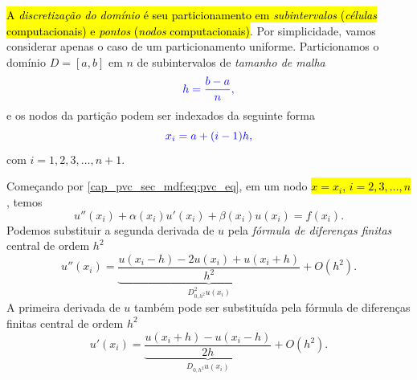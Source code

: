 \begin{flushleft}
\end{flushleft}

\hl{A \emph{discretização do domínio} é seu particionamento em \emph{subintervalos} (\emph{células} computacionais) e \emph{pontos} (\emph{nodos} computacionais)}. Por simplicidade, vamos considerar apenas o caso de um particionamento uniforme. Particionamos o domínio $D = [a, b]$ em $n$ de subintervalos de \emph{tamanho de malha}
\begin{equation}\color{blue}h = \frac{b-a}{n},
\end{equation}
e os nodos da partição podem ser indexados da seguinte forma
\begin{equation}\color{blue}x_i = a + (i-1)h,
\end{equation}
com $i = 1, 2, 3, \dotsc, n+1$.

\begin{flushleft}
\end{flushleft}

Começando por \eqref{cap_pvc_sec_mdf:eq:pvc_eq}, em um nodo \hl{$x=x_i$, $i=2, 3, \dotsc, n$}, temos
\begin{equation}\label{cap_pvc_sec_mdf:eq:pvc_eq_no_ponto}
  u''(x_i) + \alpha(x_i) u'(x_i) + \beta(x_i) u(x_i) = f(x_i).
\end{equation}
Podemos substituir a segunda derivada de $u$ pela \emph{fórmula de diferenças finitas} central de ordem $h^2$
\begin{equation}
  u''(x_i) = \underbrace{\frac{u(x_i-h) - 2u(x_i) + u(x_i+h)}{h^2}}_{D^2_{0,h^2}u(x_i)} + O(h^2).
\end{equation}
A primeira derivada de $u$ também pode ser substituída pela fórmula de diferenças finitas central de ordem $h^2$
\begin{equation}
  u'(x_i) = \underbrace{\frac{u(x_i+h)-u(x_i-h)}{2h}}_{D_{0,h^2}u(x_i)} + O(h^2).
\end{equation}


